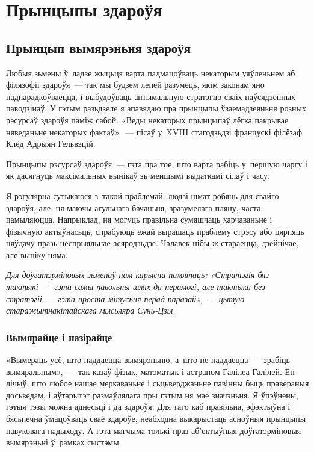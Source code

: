 \chapter{Прынцыпы здароўя}

\section{Прынцып вымярэньня здароўя}

Любыя зьмены ў~ладзе жыцьця варта падмацоўваць некаторым уяўленьнем аб філязофіі здароўя~--- так мы будзем лепей разумець, якім законам яно падпарадкоўваецца, і выбудоўваць аптымальную стратэгію сваіх паўсядзённых паводзінаў. У гэтым разьдзеле я апавядаю пра прынцыпы ўзаемадзеяньня розных рэсурсаў здароўя паміж сабой. «Веды некаторых прынцыпаў лёгка пакрывае няведаньне некаторых фактаў»,~--- пісаў у~XVIII стагодзьдзі францускі філёзаф Клёд Адрыян Гельвэцій.

Прынцыпы рэсурсаў здароўя~--- гэта пра тое, што варта рабіць у~першую чаргу і як дасягнуць максімальных вынікаў зь меншымі выдаткамі сілаў і часу.

Я рэгулярна сутыкаюся з~такой праблемай: людзі шмат робяць для свайго здароўя, але, ня маючы агульнага бачаньня, зразумелага пляну, часта памыляюцца. Напрыклад, ня могуць правільна сумяшчаць харчаваньне і фізычную актыўнасьць, спрабуюць ежай вырашаць праблему стрэсу або цярпяць няўдачу празь неспрыяльнае асяродзьдзе. Чалавек нібы ж стараецца, дзейнічае, але выніку няма. 

\emph{Для доўгатэрміновых зьменаў нам карысна памятаць: «Стратэгія бяз тактыкі~--- гэта самы павольны шлях да перамогі, але тактыка без стратэгіі~--- гэта проста мітусьня перад паразай»,~--- цытую старажытнакітайскага мысьляра Сунь-Цзы.}

\subsection*{Вымярайце і назірайце}

«Вымераць усё, што паддаецца вымярэньню, а~што не паддаецца~--- зрабіць вымяральным»,~--- так казаў фізык, матэматык і астраном Галілеа Галілей. Ён лічыў, што любое нашае меркаваньне і сьцьверджаньне павінны быць правераныя досьведам, і аўтарытэт размаўлялага пры гэтым ня мае значэньня. Я ўпэўнены, гэтыя тэзы можна аднесьці і да здароўя. Для таго каб правільна, эфэктыўна і бясьпечна ўмацоўваць сваё здароўе, неабходна выкарыстаць асноўныя прынцыпы навуковага падыходу. А гэта магчыма толькі праз аб'ектыўныя доўгатэрміновыя вымярэньні ў~рамках сыстэмы.

